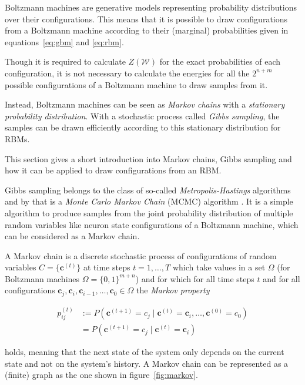 Boltzmann machines are generative models representing probability distributions over their configurations. This means that it is possible to draw configurations from a Boltzmann machine
according to their (marginal) probabilities given in equations~\ref{eq:gbm} and \ref{eq:rbm}.

Though it is required to calculate $Z(\mathcal{W})$ for the exact probabilities of each configuration,
it is not necessary to calculate the energies for all the $2^{n+m}$ possible configurations of 
a Boltzmann machine to draw samples from it.

Instead, Boltzmann machines can be seen as \textit{Markov chains} with a \textit{stationary probability
distribution}. With a stochastic process called \textit{Gibbs sampling}, the samples can be drawn efficiently according to this stationary distribution for RBMs.

This section gives a short introduction into Markov chains, Gibbs sampling and how it can be applied 
to draw configurations from an RBM.

Gibbs sampling belongs to the class of so-called \textit{Metropolis-Hastings} algorithms and by that is 
a \textit{Monte Carlo Markov Chain} (MCMC) algorithm \cite{hastings1970monte}. It is a simple algorithm to produce samples from the joint probability distribution of multiple random variables like neuron state configurations
of a Boltzmann machine, which can be considered as a Markov chain.

A Markov chain is a discrete stochastic process of configurations of random variables $C=\{\bm{c}^{(t)}\}$
at time steps $t=1, \dots, T$ which take values in a set $\Omega$ (for Boltzmann machines 
$\Omega=\{0,1\}^{m+n}$) and for which for all time steps $t$ and for all configurations 
$\bm{c}_j, \bm{c}_i, \bm{c}_{i-1}, \dots, \bm{c}_0 \in \Omega$ the \textit{Markov property}

\begin{align}
    p_{ij}^{(t)} &:= P(\bm{c}^{(t+1)} = c_j \mid \bm{c}^{(t)} = \bm{c}_i, \dots, \bm{c}^{(0)} = c_0) \\
                 & = P(\bm{c}^{(t+1)} = c_j \mid \bm{c}^{(t)} = \bm{c}_i) 
\end{align}

holds, meaning that the next state of the system only depends on the current state and not on the system's history. A Markov chain can be represented as a (finite) graph as the one shown in figure~\ref{fig:markov}.

